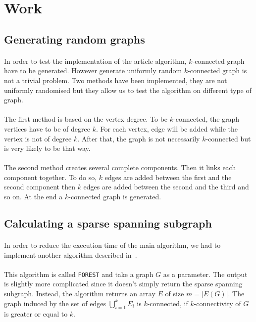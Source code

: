 \section{Work}

\subsection{Generating random graphs}
\paragraph{}
In order to test the implementation of the article algorithm, $k$-connected 
graph have to be generated. However generate uniformly random $k$-connected
graph is not a trivial problem. Two methods have been implemented, they are not
uniformly randomised but they allow us to test the algorithm on different type
of graph.

\paragraph{}
The first method is based on the vertex degree. To be $k$-connected, the graph
vertices have to be of degree $k$. For each vertex, edge will be added while
the vertex is not of degree $k$. After that, the graph is not necessarily 
$k$-connected but is very likely to be that way.

\paragraph{}
The second method creates several complete components. Then it links each component
together. To do so, $k$ edges are added between the first and the second component
then $k$ edges are added between the second and the third and so on. At the end a
$k$-connected graph is generated.

\subsection{Calculating a sparse spanning subgraph}
\paragraph{}
In order to reduce the execution time of the main algorithm, we had to
implement another algorithm described in~\cite{NaIb92}.

\paragraph{}
This algorithm is called \verb!FOREST! and take a graph $G$ as a parameter. The
output is slightly more complicated since it doesn't simply return the
sparse spanning subgraph. Instead, the algorithm returns an array $E$ of size
$m = |E(G)|$. The graph induced by the set of edges $\bigcup \limits_{i=1}^k E_i$
is $k$-connected, if $k$-connectivity of $G$ is greater or equal to $k$.

